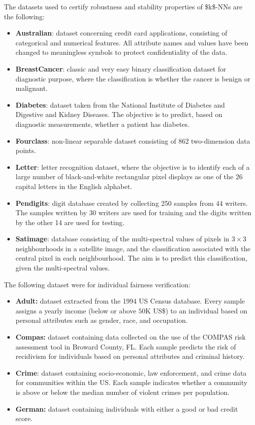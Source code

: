 \noindent
The datasets used to certify robustness and stability properties of \acsp{$k$-NN} are the following:
\begin{itemize}
	\item \textbf{Australian}: dataset concerning credit card applications, consisting of categorical and numerical features. All attribute names and values have been changed to meaningless symbols to protect confidentiality of the data.
	\item \textbf{BreastCancer}: classic and very easy binary classification dataset for diagnostic purpose, where the classification is whether the cancer is benign or malignant.
	\item \textbf{Diabetes}: dataset taken from the National Institute of Diabetes and Digestive and Kidney Diseases. The objective is to predict, based on diagnostic measurements, whether a patient has diabetes.
	\item \textbf{Fourclass}: non-linear separable dataset consisting of $862$ two-dimension data points.
	\item \textbf{Letter}: letter recognition dataset, where the objective is to identify each of a large number of black-and-white rectangular pixel displays as one of the $26$ capital letters in the English alphabet.
	\item \textbf{Pendigits}: digit database created by collecting 250 samples from 44 writers. The samples written by 30 writers are used for training and the digits written by the other 14 are used for testing.
	\item \textbf{Satimage}: database consisting of the multi-spectral values of pixels in $3 \times 3$ neighbourhoods in a satellite image, and the classification associated with the central pixel in each neighbourhood. The aim is to predict this classification, given the multi-spectral values.
\end{itemize}

\noindent
The following dataset were for individual fairness verification:
\begin{itemize}
	\item \textbf{Adult:} dataset extracted from the 1994 US Census database. Every sample assigns a yearly income (below or above $50$K US\$) to an individual based on personal attributes such as gender, race, and occupation.
	\item \textbf{Compas:} dataset containing data collected on the use of the COMPAS risk assessment tool in Broward County, FL. Each sample predicts the risk of recidivism for individuals based on personal attributes and criminal history.
	\item \textbf{Crime}: dataset containing socio-economic, law enforcement, and crime data for communities within the US. Each sample indicates whether a community is above or below the median number of violent crimes per population.
	\item \textbf{German:} dataset containing individuals with either a good or bad credit score.
\end{itemize}

